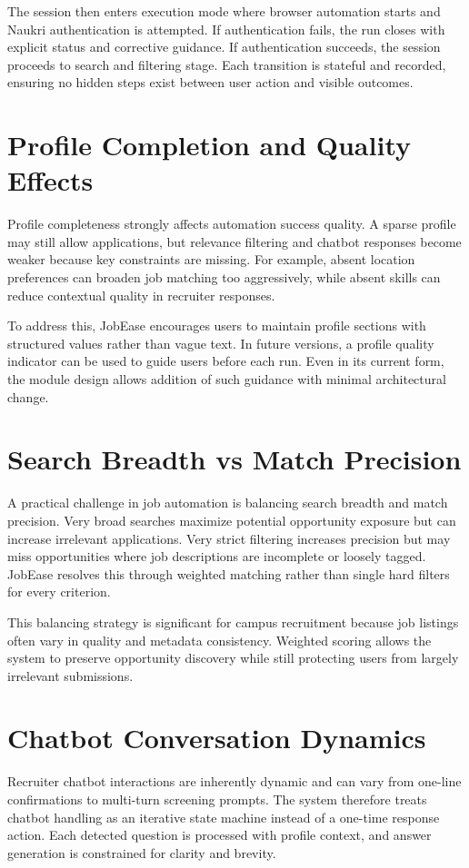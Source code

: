 \documentclass[12pt,a4paper,oneside]{report}
\begin{document}
The session then enters execution mode where browser automation starts and Naukri authentication is attempted. If authentication fails, the run closes with explicit status and corrective guidance. If authentication succeeds, the session proceeds to search and filtering stage. Each transition is stateful and recorded, ensuring no hidden steps exist between user action and visible outcomes.

\section{Profile Completion and Quality Effects}
Profile completeness strongly affects automation success quality. A sparse profile may still allow applications, but relevance filtering and chatbot responses become weaker because key constraints are missing. For example, absent location preferences can broaden job matching too aggressively, while absent skills can reduce contextual quality in recruiter responses.

To address this, JobEase encourages users to maintain profile sections with structured values rather than vague text. In future versions, a profile quality indicator can be used to guide users before each run. Even in its current form, the module design allows addition of such guidance with minimal architectural change.

\section{Search Breadth vs Match Precision}
A practical challenge in job automation is balancing search breadth and match precision. Very broad searches maximize potential opportunity exposure but can increase irrelevant applications. Very strict filtering increases precision but may miss opportunities where job descriptions are incomplete or loosely tagged. JobEase resolves this through weighted matching rather than single hard filters for every criterion.

This balancing strategy is significant for campus recruitment because job listings often vary in quality and metadata consistency. Weighted scoring allows the system to preserve opportunity discovery while still protecting users from largely irrelevant submissions.

\section{Chatbot Conversation Dynamics}
Recruiter chatbot interactions are inherently dynamic and can vary from one-line confirmations to multi-turn screening prompts. The system therefore treats chatbot handling as an iterative state machine instead of a one-time response action. Each detected question is processed with profile context, and answer generation is constrained for clarity and brevity.
\end{document}
